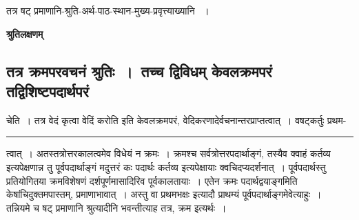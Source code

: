 \documentclass[11pt, openany]{book}
\begin{document}
{\bl तत्र षट् प्रमाणानि-श्रुति-अर्थ-पाठ-स्थान-मुख्य-प्रवृत्त्याख्यानि
~।\\
\begin {center}\textbf {श्रुतिलक्षणम्}\end {center}

\subsection{तत्र {\al क्रमपरवचनं श्रुतिः}~।~तच्च द्विविधम् {\al केवलक्रमपरं} तद्विशिष्टपदार्थपरं} चेति~। तत्र {\qtl वेदं कृत्वा वेदिं करोति} इति केवलक्रमपरं, वेदिकरणादेर्वचनान्तरप्राप्तत्वात्~। {\qtl वषट्कर्तुः प्रथम-\\}}
\hrule
\vspace{3mm}
\noindent
त्वात्~। अतस्तत्रोत्तरकालत्वमेव विधेयं न क्रमः~। क्रमश्च सर्वत्रोत्तरपदार्थाङ्गं, तस्यैव क्वाहं कर्तव्य इत्यपेक्षणान्न तु पूर्वपदार्थाङ्गं मदुत्तरं कः पदार्थः कर्तव्य इत्यपेक्षायाः
क्वचिदप्यदर्शनात्~। पूर्वपदार्थस्तु प्रतियोगितया क्रमविशेषणं दर्शपूर्णमासादिरिव पूर्वकालतायाः~। एतेन क्रमः पदार्थद्वयाङ्गमिति केषांचिदुक्तमपास्तम्, प्रमाणाभावात्~। अस्तु वा {\qt प्रथमभक्षः} इत्यादौ प्राथम्यं पूर्वपदार्थाङ्गमेवेत्याहुः~।\\

 तन्नियमे च षट् प्रमाणानि श्रुत्यादीनि भवन्तीत्याह तत्र, क्रम इत्यर्थः~।\\
\end{document}
